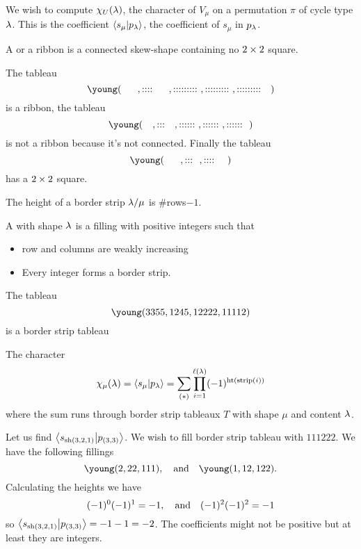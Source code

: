 \documentclass[12pt]{memoir}
\begin{document}
We wish to compute $\chi_U(\lambda)$, the character of $V_\mu$ on a permutation $\pi$ of cycle type $\lambda$. This is the coefficient $\braket{s_\mu}{p_\lambda}$, the coefficient of $s_\mu$ in $p_\lambda$.

\begin{Def}
    A  or a ribbon is a connected skew-shape containing no $2\times 2$ square.
\end{Def}

\begin{Ex}
    The tableau
    $$\young(~~~~~,::::~~~~~,:::::::::~,:::::::::~,:::::::::~~~)$$
    is a ribbon, the tableau
    $$\young(~~~,:::~~~,::::::~,::::::~,::::::~~)$$
    is not a ribbon because it's not connected. Finally the tableau 
    $$\young(~~~~~,:::~~,::::~~~~)$$
    has a $2\times 2$ square.
\end{Ex}

\begin{Def}
    The height of a border strip $\lambda/\mu$ is $\#$rows$-1$.\par
    A  with shape $\lambda$ is a filling with positive integers such that 
    \begin{itemize}
        \item row and columns are weakly increasing 
        \item Every integer forms a border strip.
    \end{itemize}
\end{Def}

\begin{Ex}
    The tableau 
    $$\young(3355,1245,12222,11112)$$
    is a border strip tableau
\end{Ex}

\begin{Th}
    The character 
    $$\chi_\mu(\lambda)=\braket{s_\mu}{p_\lambda}=\sum_{(\ast)}\prod_{i=1}^{\ell(\lambda)}(-1)^{\operatorname{ht}(\text{strip}(i))}$$
    where the sum runs through border strip tableaux $T$ with shape $\mu$ and content $\lambda$.
\end{Th}

\begin{Ex}
    Let us find $\braket{s_{\operatorname{sh}(3,2,1)}}{p_{(3,3)}}$. We wish to fill border strip tableau with $111222$. We have the following fillings 
    $$\young(2,22,111),\word{and}\young(1,12,122).$$
    Calculating the heights we have 
    $$(-1)^0(-1)^1=-1,\quad\text{and}\quad(-1)^2(-1)^2=-1$$
    so $\braket{s_{\operatorname{sh}(3,2,1)}}{p_{(3,3)}}=-1-1=-2$.
The coefficients might not be positive but at least they are integers. 
\end{Ex}
\end{document}
